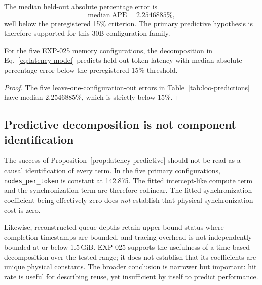The median held-out absolute percentage error is
\begin{equation}
    \mathrm{median\ APE}
    =
    2.2546885\%,
    \label{eq:median-ape}
\end{equation}
well below the preregistered 15\% criterion. The primary predictive hypothesis is therefore supported for this 30B configuration family.

\begin{proposition}
\label{prop:latency-predictive}
For the five EXP-025 memory configurations, the decomposition in Eq.~\eqref{eq:latency-model} predicts held-out token latency with median absolute percentage error below the preregistered 15\% threshold.
\end{proposition}

\begin{proof}
The five leave-one-configuration-out errors in Table~\ref{tab:loo-predictions} have median 2.2546885\%, which is strictly below 15\%.
\end{proof}

\subsection{Predictive decomposition is not component identification}

The success of Proposition~\ref{prop:latency-predictive} should not be read as a causal identification of every term. In the five primary configurations, \texttt{nodes\_per\_token} is constant at 142.875. The fitted intercept-like compute term and the synchronization term are therefore collinear. The fitted synchronization coefficient being effectively zero does \emph{not} establish that physical synchronization cost is zero.

Likewise, reconstructed queue depths retain upper-bound status where completion timestamps are bounded, and tracing overhead is not independently bounded at or below 1.5\,GiB. EXP-025 supports the usefulness of a time-based decomposition over the tested range; it does not establish that its coefficients are unique physical constants. The broader conclusion is narrower but important: hit rate is useful for describing reuse, yet insufficient by itself to predict performance.
